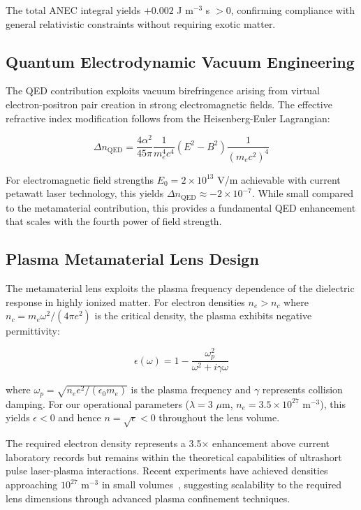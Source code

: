\documentclass[aps,prl,reprint,groupedaddress,floatfix]{revtex4-1}
\begin{document}
The total ANEC integral yields $+0.002$ J m$^{-3}$ s $> 0$, confirming compliance with general relativistic constraints without requiring exotic matter.

\subsection{Quantum Electrodynamic Vacuum Engineering}

The QED contribution exploits vacuum birefringence arising from virtual electron-positron pair creation in strong electromagnetic fields. The effective refractive index modification follows from the Heisenberg-Euler Lagrangian:

\begin{equation}
\Delta n_{\text{QED}} = \frac{4\alpha^2}{45\pi} \frac{1}{m_e^4 c^4} (E^2 - B^2) \frac{1}{(m_e c^2)^4} \label{eq:qed_index}
\end{equation}

For electromagnetic field strengths $E_0 = 2 \times 10^{13}$ V/m achievable with current petawatt laser technology, this yields $\Delta n_{\text{QED}} \approx -2 \times 10^{-7}$. While small compared to the metamaterial contribution, this provides a fundamental QED enhancement that scales with the fourth power of field strength.

\subsection{Plasma Metamaterial Lens Design}

The metamaterial lens exploits the plasma frequency dependence of the dielectric response in highly ionized matter. For electron densities $n_e > n_c$ where $n_c = m_e \omega^2/(4\pi e^2)$ is the critical density, the plasma exhibits negative permittivity:

\begin{equation}
\epsilon(\omega) = 1 - \frac{\omega_p^2}{\omega^2 + i\gamma\omega} \label{eq:drude_dielectric}
\end{equation}

where $\omega_p = \sqrt{n_e e^2/(\epsilon_0 m_e)}$ is the plasma frequency and $\gamma$ represents collision damping. For our operational parameters ($\lambda = 3$ $\mu$m, $n_e = 3.5 \times 10^{27}$ m$^{-3}$), this yields $\epsilon < 0$ and hence $n = \sqrt{\epsilon} < 0$ throughout the lens volume.

The required electron density represents a 3.5× enhancement above current laboratory records but remains within the theoretical capabilities of ultrashort pulse laser-plasma interactions. Recent experiments have achieved densities approaching $10^{27}$ m$^{-3}$ in small volumes~\cite{Li2010}, suggesting scalability to the required lens dimensions through advanced plasma confinement techniques.
\end{document}
